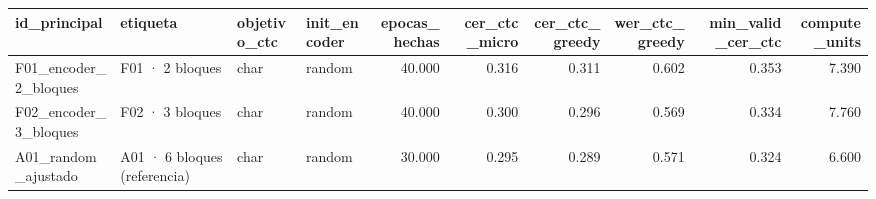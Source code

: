 \begin{tabular}{llllrrrrrr}
\toprule
id_principal & etiqueta & objetivo_ctc & init_encoder & epocas_hechas & cer_ctc_micro & cer_ctc_greedy & wer_ctc_greedy & min_valid_cer_ctc & compute_units \\
\midrule
F01_encoder_2_bloques & F01 · 2 bloques & char & random & 40.000 & 0.316 & 0.311 & 0.602 & 0.353 & 7.390 \\
F02_encoder_3_bloques & F02 · 3 bloques & char & random & 40.000 & 0.300 & 0.296 & 0.569 & 0.334 & 7.760 \\
A01_random_ajustado & A01 · 6 bloques (referencia) & char & random & 30.000 & 0.295 & 0.289 & 0.571 & 0.324 & 6.600 \\
\bottomrule
\end{tabular}
